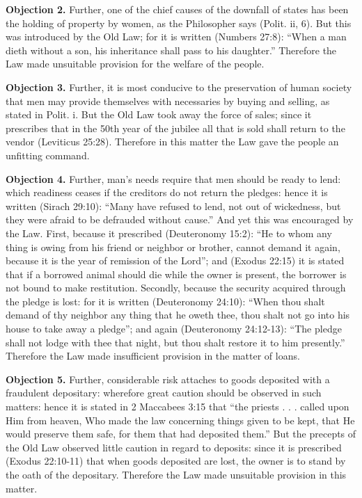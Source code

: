 \textbf{Objection 2.} Further, one of the chief causes of the downfall of states has been the holding of property by women, as the Philosopher says (Polit. ii, 6). But this was introduced by the Old Law; for it is written (Numbers 27:8): ``When a man dieth without a son, his inheritance shall pass to his daughter.'' Therefore the Law made unsuitable provision for the welfare of the people.

\textbf{Objection 3.} Further, it is most conducive to the preservation of human society that men may provide themselves with necessaries by buying and selling, as stated in Polit. i. But the Old Law took away the force of sales; since it prescribes that in the 50th year of the jubilee all that is sold shall return to the vendor (Leviticus 25:28). Therefore in this matter the Law gave the people an unfitting command.

\textbf{Objection 4.} Further, man's needs require that men should be ready to lend: which readiness ceases if the creditors do not return the pledges: hence it is written (Sirach 29:10): ``Many have refused to lend, not out of wickedness, but they were afraid to be defrauded without cause.'' And yet this was encouraged by the Law. First, because it prescribed (Deuteronomy 15:2): ``He to whom any thing is owing from his friend or neighbor or brother, cannot demand it again, because it is the year of remission of the Lord''; and (Exodus 22:15) it is stated that if a borrowed animal should die while the owner is present, the borrower is not bound to make restitution. Secondly, because the security acquired through the pledge is lost: for it is written (Deuteronomy 24:10): ``When thou shalt demand of thy neighbor any thing that he oweth thee, thou shalt not go into his house to take away a pledge''; and again (Deuteronomy 24:12-13): ``The pledge shall not lodge with thee that night, but thou shalt restore it to him presently.'' Therefore the Law made insufficient provision in the matter of loans.

\textbf{Objection 5.} Further, considerable risk attaches to goods deposited with a fraudulent depositary: wherefore great caution should be observed in such matters: hence it is stated in 2 Maccabees 3:15 that ``the priests . . . called upon Him from heaven, Who made the law concerning things given to be kept, that He would preserve them safe, for them that had deposited them.'' But the precepts of the Old Law observed little caution in regard to deposits: since it is prescribed (Exodus 22:10-11) that when goods deposited are lost, the owner is to stand by the oath of the depositary. Therefore the Law made unsuitable provision in this matter.


